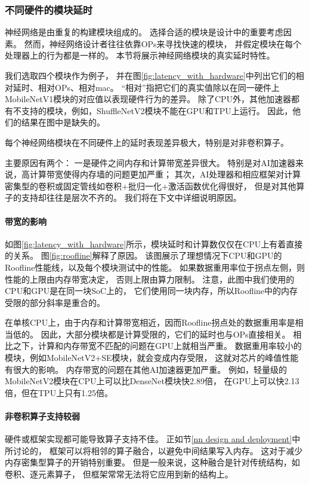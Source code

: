 \subsubsection{不同硬件的模块延时}
\label{analysis:op block:block with hardware}


神经网络是由重复的构建模块组成的。
选择合适的模块是设计中的重要考虑因素。
然而，神经网络设计者往往依靠OPs来寻找快速的模块，
并假定模块在每个处理器上的行为都是一样的。
本节将展示神经网络模块的真实延时特性。

我们选取四个模块作为例子，
并在图\ref{fig:latency_with_hardware}中列出它们的相对延时、相对OPs、相对mac。
``相对''指把它们的真实值除以在同一硬件上MobileNetV1模块的对应值以表现硬件行为的差异。
除了CPU外，其他加速器都有不支持的模块，例如，ShuffleNetV2模块不能在GPU和TPU上运行。
因此，他们的结果在图中是缺失的。

\begin{finding}
    每个神经网络模块在不同硬件上的延时表现差异极大，特别是对非卷积算子。
\end{finding}

主要原因有两个：
一是硬件之间内存和计算带宽差异很大。
特别是对AI加速器来说，高计算带宽使得内存墙的问题更加严重；
其次，AI处理器和相应框架对计算密集型的卷积或固定管线如卷积+批归一化+激活函数优化得很好，
但是对其他算子的支持却往往是层次不齐的。
我们将在下文中详细说明原因。

\paragraph{带宽的影响}
如图\ref{fig:latency_with_hardware}所示，模块延时和计算数仅仅在CPU上有着直接的关系。
图\ref{fig:roofline}解释了原因。
该图展示了理想情况下CPU和GPU的Roofline性能线，以及每个模块测试中的性能。
如果数据重用率位于拐点左侧，则性能的上限由内存带宽决定，
否则上限由算力限制。
注意，此图中我们使用的CPU和GPU是在同一块SoC上的，
它们使用同一块内存，所以Roofline中的内存受限的部分斜率是重合的。

在单核CPU上，由于内存和计算带宽相近，因而Roofline拐点处的数据重用率是相当低的。
因此，大部分模块都是计算受限的，它们的延时也与OPs直接相关。
相比之下，计算和内存带宽不匹配的问题在GPU上就相当严重。
数据重用率较小的模块，例如MobileNetV2+SE模块，就会变成内存受限，
这就对芯片的峰值性能有很大的影响。
内存带宽的问题在其他AI加速器更加严重。
例如，轻量级的MobileNetV2模块在CPU上可以比DenseNet模块快2.89倍，
在GPU上可以快2.13倍，但在TPU上只有1.25倍。

\paragraph{非卷积算子支持较弱}
硬件或框架实现都可能导致算子支持不佳。
正如节\ref{nn design and deployment}中所讨论的，
框架可以将相邻的算子融合，以避免中间结果写入内存。
这对于减少内存密集型算子的开销特别重要。
但是一般来说，这种融合是针对传统结构，如卷积、逐元素算子，
但框架常常无法将它应用到新的结构上。

